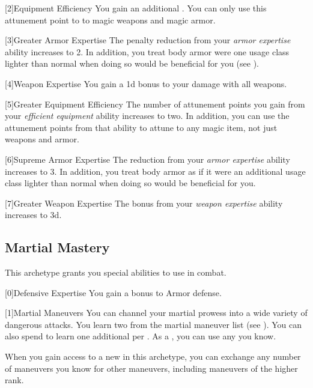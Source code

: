         [2]{Equipment Efficiency} You gain an additional .
        You can only use this attunement point to  to magic weapons and magic armor.

        [3]{Greater Armor Expertise}
        The penalty reduction from your \textit{armor expertise} ability increases to 2.
        In addition, you treat body armor were one usage class lighter than normal when doing so would be beneficial for you (see ).

        [4]{Weapon Expertise} You gain a \plus1d bonus to your damage with all weapons.

        [5]{Greater Equipment Efficiency} The number of attunement points you gain from your \textit{efficient equipment} ability increases to two.
        In addition, you can use the attunement points from that ability to attune to any magic item, not just weapons and armor.

        [6]{Supreme Armor Expertise}
        The  reduction from your \textit{armor expertise} ability increases to 3.
        In addition, you treat body armor as if it were an additional usage class lighter than normal when doing so would be beneficial for you.

        [7]{Greater Weapon Expertise} The bonus from your \textit{weapon expertise} ability increases to \plus3d.

    \newpage
    \subsection{Martial Mastery}
        This archetype grants you special abilities to use in combat.

        [0]{Defensive Expertise} You gain a  bonus to Armor defense.

        {
            [1]{Martial Maneuvers}
            You can channel your martial prowess into a wide variety of dangerous attacks.
            You learn two  from the martial maneuver list (see ).
            You can also spend  to learn one additional  per .
            As a , you can use any  you know.

            When you gain access to a new  in this archetype,
                you can exchange any number of maneuvers you know for other maneuvers,
                including maneuvers of the higher rank.
        }

